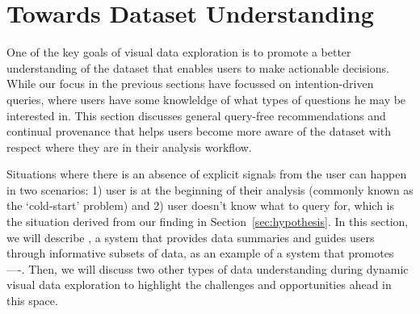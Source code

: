 \section{Towards Dataset Understanding\label{sec:understanding}}
One of the key goals of visual data exploration is to promote a better understanding of the dataset that enables users to make actionable decisions. While our focus in the previous sections have focussed on intention-driven queries, where users have some knowleldge of what types of questions he may be interested in. This section discusses general query-free recommendations and continual provenance that helps users become more aware of the dataset with respect where they are in their analysis workflow. 
\par Situations where there is an absence of explicit signals from the user can happen in two scenarios: 1) user is at the beginning of their analysis (commonly known as the `cold-start' problem) and 2) user doesn't know what to query for, which is the situation derived from our \zv finding in Section~\ref{sec:hypothesis}. In this section, we will describe \sbd, a system that provides data summaries and guides users through informative subsets of data, as an example of a system that promotes ----. Then, we will discuss two other types of data understanding during dynamic visual data exploration to highlight the challenges and opportunities ahead in this space.
